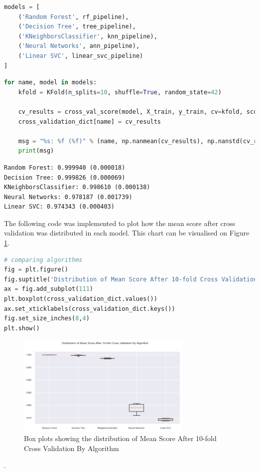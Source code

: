 \documentclass{article}
\begin{document}
\begin{lstlisting}[language=Python]
models = [    
    ('Random Forest', rf_pipeline), 
    ('Decision Tree', tree_pipeline),
    ('KNeighborsClassifier', knn_pipeline),    
    ('Neural Networks', ann_pipeline), 
    ('Linear SVC', linear_svc_pipeline)
]
\end{lstlisting}
\begin{lstlisting}[language=Python]
for name, model in models:
    kfold = KFold(n_splits=10, shuffle=True, random_state=42)
    
    cv_results = cross_val_score(model, X_train, y_train, cv=kfold, scoring='accuracy')
    cross_validation_dict[name] = cv_results

    msg = "%s: %f (%f)" % (name, np.nanmean(cv_results), np.nanstd(cv_results))
    print(msg)
\end{lstlisting}
\begin{verbatim}
Random Forest: 0.999940 (0.000018)
Decision Tree: 0.999826 (0.000069)
KNeighborsClassifier: 0.998610 (0.000138)
Neural Networks: 0.978187 (0.001739)
Linear SVC: 0.974343 (0.000403)
\end{verbatim}

The following code was implemented to plot how the mean score after cross validation was distributed in each model. This chart can be visualised on Figure \ref{fig:10_fold_cv}.

\begin{lstlisting}[language=Python]
# comparing algorithms
fig = plt.figure()
fig.suptitle('Distribution of Mean Score After 10-fold Cross Validation By Algorithm')
ax = fig.add_subplot(111)
plt.boxplot(cross_validation_dict.values())
ax.set_xticklabels(cross_validation_dict.keys())
fig.set_size_inches(8,4)
plt.show()
\end{lstlisting}

\begin{figure}
\centering
\includegraphics[width=0.75\textwidth]{10_fold_cv.png}
\caption{\label{fig:10_fold_cv}Box plots showing the distribution of Mean Score After 10-fold Cross Validation By Algorithm}
\end{figure}.
\end{document}
